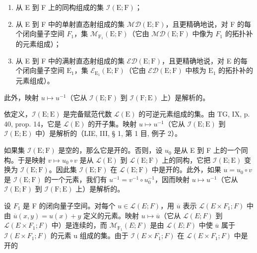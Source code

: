 \begin{enumerate}
\def\labelenumi{\alph{enumi})}
\item
  从 E 到 F 上的同构组成的集 \(\mathcal{I}(\mathrm{E};\mathrm{F})\)；
\item
   从 E 到 F 中的单射直态射组成的集 \(\mathcal{M}\mathcal{D}(\mathrm{E};\mathrm{F})\)，且更精确地说，对 F 的每个闭向量子空间 \(F_{1}\)，集 \(\mathcal{M}_{\mathrm{F}_{1}}(\mathrm{E};\mathrm{F})\)（它由 \(\mathcal{M}\mathcal{D}(\mathrm{E};\mathrm{F})\) 中像为 \(F_{1}\) 的拓扑补的元素组成）；
\item
   从 E 到 F 中的满射直态射组成的集 \(\mathcal{E}\mathcal{D}(\mathrm{E};\mathrm{F})\)，且更精确地说，对 E 的每个闭向量子空间 \(\mathrm{E}_1\)，集 \(\mathcal{E}_{\mathrm{E}_1}(\mathrm{E};\mathrm{F})\)（它由 \(\mathcal{E}\mathcal{D}(\mathrm{E};\mathrm{F})\) 中核为 \(\mathrm{E}_1\) 的拓扑补的元素组成）。
\end{enumerate}

此外，映射 \(u \mapsto u^{-1}\)（它从 \(\mathcal{I}(\mathrm{E};\mathrm{F})\) 到 \(\mathcal{I}(\mathrm{F};\mathrm{E})\) 上）是解析的。

依定义，\(\mathcal{I}(\mathrm{E};\mathrm{E})\) 是完备赋范代数 \(\mathcal{L}(\mathrm{E})\) 的可逆元素组成的集。由 TG, IX, p. 40, prop. 14，它是 \(\mathcal{L}(\mathrm{E})\) 的开子集。映射 \(u\mapsto u^{-1}\)（它从 \(\mathcal{I}(\mathrm{E};\mathrm{E})\) 到 \(\mathcal{I}(\mathrm{E};\mathrm{E})\) 中）是解析的（LIE, III, § 1, 第 1 目, 例子 2）。

如果集 \(\mathcal{I}(\mathrm{E};\mathrm{F})\) 是空的，那么它是开的。否则，设 \(u_0\) 是从 E 到 F 上的一个同构。于是映射 \(v\mapsto u_0\circ v\) 是从 \(\mathcal{L}(\mathrm{E})\) 到 \(\mathcal{L}(\mathrm{E};\mathrm{F})\) 上的同构，它把 \(\mathcal{I}(\mathrm{E};\mathrm{E})\) 变换为 \(\mathcal{I}(\mathrm{E};\mathrm{F})\)。因此集 \(\mathcal{I}(\mathrm{E};\mathrm{F})\) 在 \(\mathcal{L}(\mathrm{E};\mathrm{F})\) 中是开的。此外，如果 \(u = u_0\circ v\) 是 \(\mathcal{I}(\mathrm{E};\mathrm{F})\) 的一个元素，我们有 \(u^{-1} = v^{-1}\circ u_0^{-1}\)，因而映射 \(u\mapsto u^{-1}\)（它从 \(\mathcal{I}(\mathrm{E};\mathrm{F})\) 到 \(\mathcal{I}(\mathrm{F};\mathrm{E})\) 上）是解析的。

设 \(F_{1}\) 是 F 的闭向量子空间。对每个 \(u \in \mathcal{L}(E;F)\)，用 \(\overline{u}\) 表示 \(\mathcal{L}(E \times F_{1};F)\) 中由 \(\overline{u}(x,y) = u(x) + y\) 定义的元素。映射 \(u \mapsto \overline{u}\)（它从 \(\mathcal{L}(E;F)\) 到 \(\mathcal{L}(E \times F_{1};F)\) 中）是连续的，而 \(\mathcal{M}_{\mathrm{F}_{1}}(E;F)\) 是由 \(\mathcal{L}(E;F)\) 中使 \(\overline{u}\) 属于 \(\mathcal{I}(E \times F_{1};F)\) 的元素 u 组成的集。由于 \(\mathcal{I}(E \times F_{1};F)\) 在 \(\mathcal{L}(E \times F_{1};F)\) 中是开的

